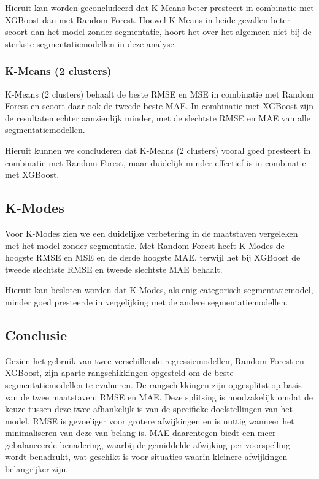\vspace{1em}

Hieruit kan worden geconcludeerd dat K-Means beter presteert in combinatie met XGBoost dan met Random Forest. Hoewel K-Means in beide gevallen beter scoort dan het model zonder segmentatie, hoort het over het algemeen niet bij de sterkste segmentatiemodellen in deze analyse.


\subsubsection*{K-Means (2 clusters)}

K-Means (2 clusters) behaalt de beste RMSE en MSE in combinatie met Random Forest en scoort daar ook de tweede beste MAE. In combinatie met XGBoost zijn de resultaten echter aanzienlijk minder, met de slechtste RMSE en MAE van alle segmentatiemodellen.

\vspace{1em}

Hieruit kunnen we concluderen dat K-Means (2 clusters) vooral goed presteert in combinatie met Random Forest, maar duidelijk minder effectief is in combinatie met XGBoost.


\subsection*{K-Modes}

Voor K-Modes zien we een duidelijke verbetering in de maatstaven vergeleken met het model zonder segmentatie. Met Random Forest heeft K-Modes de hoogste RMSE en MSE en de derde hoogste MAE, terwijl het bij XGBoost de tweede slechtste RMSE en tweede slechtste MAE behaalt.

\vspace{1em}

Hieruit kan besloten worden dat K-Modes, als enig categorisch segmentatiemodel, minder goed presteerde in vergelijking met de andere segmentatiemodellen.

\newpage

\subsection*{Conclusie}


Gezien het gebruik van twee verschillende regressiemodellen, Random Forest en XGBoost, zijn aparte rangschikkingen opgesteld om de beste segmentatiemodellen te evalueren. De rangschikkingen zijn opgesplitst op basis van de twee maatstaven: RMSE en MAE. Deze splitsing is noodzakelijk omdat de keuze tussen deze twee afhankelijk is van de specifieke doelstellingen van het model. RMSE is gevoeliger voor grotere afwijkingen en is nuttig wanneer het minimaliseren van deze van belang is. MAE daarentegen biedt een meer gebalanceerde benadering, waarbij de gemiddelde afwijking per voorspelling wordt benadrukt, wat geschikt is voor situaties waarin kleinere afwijkingen belangrijker zijn.


